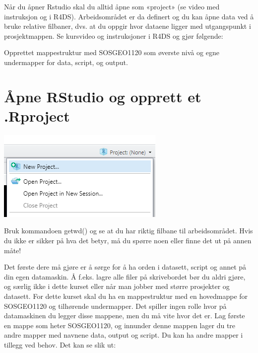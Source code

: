 \documentclass[
  letterpaper,
  DIV=11,
  numbers=noendperiod]{scrreprt}
\theoremstyle{definition}
\theoremstyle{remark}
\begin{document}
Når du åpner Rstudio skal du alltid åpne som «project» (se video med
instruksjon og i R4DS). Arbeidsområdet er da definert og du kan åpne
data ved å bruke relative filbaner, dvs. at du oppgir hvor dataene
ligger med utgangspunkt i prosjektmappen. Se kursvideo og instruksjoner
i R4DS og gjør følgende:

Opprettet mappestruktur med SOSGEO1120 som øverste nivå og egne
undermapper for data, script, og output.

\hypertarget{uxe5pne-rstudio-og-opprett-et-.rproject}{%
\section{Åpne RStudio og opprett et
.Rproject}\label{uxe5pne-rstudio-og-opprett-et-.rproject}}

\includegraphics{./images/proj2.png}

Bruk kommandoen getwd() og se at du har riktig filbane til
arbeidsområdet. Hvis du ikke er sikker på hva det betyr, må du spørre
noen eller finne det ut på annen måte!

Det første dere må gjøre er å sørge for å ha orden i datasett, script og
annet på din egen datamaskin. Å f.eks. lagre alle filer på skrivebordet
bør du aldri gjøre, og særlig ikke i dette kurset eller når man jobber
med større prosjekter og datasett. For dette kurset skal du ha en
mappestruktur med en hovedmappe for SOSGEO1120 og tilhørende
undermapper. Det spiller ingen rolle hvor på datamaskinen du legger
disse mappene, men du må vite hvor det er. Lag første en mappe som heter
SOSGEO1120, og innunder denne mappen lager du tre andre mapper med
navnene data, output og script. Du kan ha andre mapper i tillegg ved
behov. Det kan se slik ut:
\end{document}

